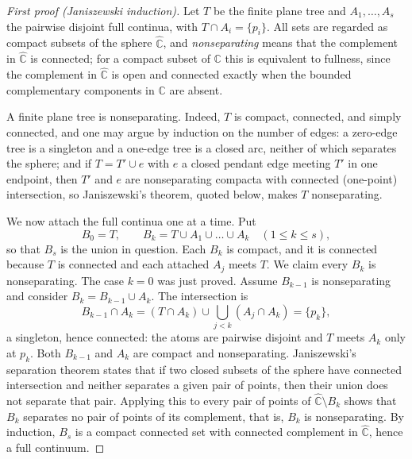 \documentclass[11pt,reqno]{amsart}
\theoremstyle{definition}
\theoremstyle{remark}
\newcommand{\C}{\mathbb C}
\newcommand{\Chat}{\widehat{\mathbb C}}
\begin{document}
\begin{proof}[First proof (Janiszewski induction)]
Let $T$ be the finite plane tree and $A_1,\dots,A_s$ the pairwise disjoint
full continua, with $T\cap A_i=\{p_i\}$.  All sets are regarded as compact
subsets of the sphere $\Chat$, and \emph{nonseparating} means that the
complement in $\Chat$ is connected; for a compact subset of $\C$ this is
equivalent to fullness, since the complement in $\Chat$ is open and
connected exactly when the bounded complementary components in $\C$ are
absent.

A finite plane tree is nonseparating.  Indeed, $T$ is compact, connected,
and simply connected, and one may argue by induction on the number of
edges: a zero-edge tree is a singleton and a one-edge tree is a closed
arc, neither of which separates the sphere; and if
$T=T'\cup e$ with $e$ a closed pendant edge meeting $T'$ in one endpoint,
then $T'$ and $e$ are nonseparating compacta with connected (one-point)
intersection, so Janiszewski's theorem, quoted below, makes $T$
nonseparating.

We now attach the full continua one at a time.  Put
\[
B_0=T,\qquad B_k=T\cup A_1\cup\dots\cup A_k\quad(1\le k\le s),
\]
so that $B_s$ is the union in question.  Each $B_k$ is compact, and it is
connected because $T$ is connected and each attached $A_j$ meets $T$.  We
claim every $B_k$ is nonseparating.  The case $k=0$ was just proved.
Assume $B_{k-1}$ is nonseparating and consider $B_k=B_{k-1}\cup A_k$.
The intersection is
\[
B_{k-1}\cap A_k
=(T\cap A_k)\cup\bigcup_{j<k}(A_j\cap A_k)
=\{p_k\},
\]
a singleton, hence connected: the atoms are pairwise disjoint and $T$
meets $A_k$ only at $p_k$.  Both $B_{k-1}$ and $A_k$ are compact and
nonseparating.  Janiszewski's separation theorem
\cite{New51,Why42} states that if two closed subsets of the sphere have
connected intersection and neither separates a given pair of points, then
their union does not separate that pair.  Applying this to every pair of
points of $\Chat\setminus B_k$ shows that $B_k$ separates no pair of
points of its complement, that is, $B_k$ is nonseparating.  By induction,
$B_s$ is a compact connected set with connected complement in $\Chat$,
hence a full continuum.
\end{proof}
\end{document}
